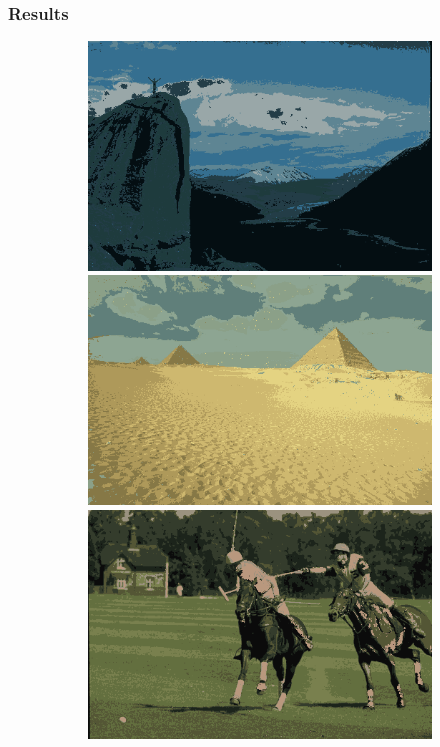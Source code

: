\documentclass{beamer}
\begin{document}
\begin{frame}
    \frametitle{Results}
    \begin{figure}
        \centering
        \begin{subfigure}[b]{0.25\textwidth}
            \centering
            \includegraphics[width=\textwidth]{../figures/methods/fp/14037_avg.png}
            \includegraphics[width=\textwidth]{../figures/methods/fp/260058_avg.png}
            \includegraphics[width=\textwidth]{../figures/methods/fp/361010_avg.png}

\end{subfigure}
\end{figure}
\end{frame}
\end{document}
